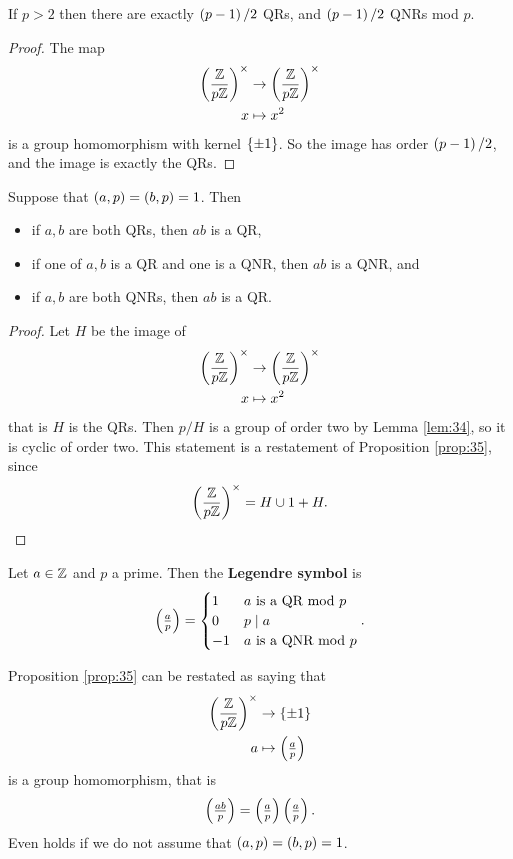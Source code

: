 \begin{lemma}
\label{lem:34}
If $ p > 2 $ then there are exactly $ \left( p - 1 \right) / 2 $ QRs, and $ \left( p - 1 \right) / 2 $ QNRs mod $ p $.
\end{lemma}

\begin{proof}
The map
\begin{align*}
\left( \dfrac{\mathbb{Z}}{p\mathbb{Z}} \right)^\times & \to \left( \dfrac{\mathbb{Z}}{p\mathbb{Z}} \right)^\times \\
x & \mapsto x^2
\end{align*}
is a group homomorphism with kernel $ \left\{ \pm 1 \right\} $. So the image has order $ \left( p - 1 \right) / 2 $, and the image is exactly the QRs.
\end{proof}

\begin{proposition}
\label{prop:35}
Suppose that $ \left( a, p \right) = \left( b, p \right) = 1 $. Then
\begin{itemize}
\item if $ a, b $ are both QRs, then $ ab $ is a QR,
\item if one of $ a, b $ is a QR and one is a QNR, then $ ab $ is a QNR, and
\item if $ a, b $ are both QNRs, then $ ab $ is a QR.
\end{itemize}
\end{proposition}

\begin{proof}
Let $ H $ be the image of
\begin{align*}
\left( \dfrac{\mathbb{Z}}{p\mathbb{Z}} \right)^\times & \to \left( \dfrac{\mathbb{Z}}{p\mathbb{Z}} \right)^\times \\
x & \mapsto x^2
\end{align*}
that is $ H $ is the QRs. Then $ \unit{p} / H $ is a group of order two by Lemma \ref{lem:34}, so it is cyclic of order two. This statement is a restatement of Proposition \ref{prop:35}, since
$$ \left( \dfrac{\mathbb{Z}}{p\mathbb{Z}} \right)^\times = H \cup 1 + H. $$
\end{proof}

\begin{definition}
Let $ a \in \mathbb{Z} $ and $ p $ a prime. Then the \textbf{Legendre symbol} is
$$ \left( \tfrac{a}{p} \right) = \begin{cases}
1 & a \text{ is a QR mod } p \\
0 & p \mid a \\
-1 & a \text{ is a QNR mod } p
\end{cases}. $$
\end{definition}

Proposition \ref{prop:35} can be restated as saying that
\begin{align*}
\left( \dfrac{\mathbb{Z}}{p\mathbb{Z}} \right)^\times & \to \left\{ \pm 1 \right\} \\
a & \mapsto \left( \tfrac{a}{p} \right)
\end{align*}
is a group homomorphism, that is
$$ \left( \tfrac{ab}{p} \right) = \left( \tfrac{a}{p} \right)\left( \tfrac{a}{p} \right). $$
Even holds if we do not assume that $ \left( a, p \right) = \left( b, p \right) = 1 $.

